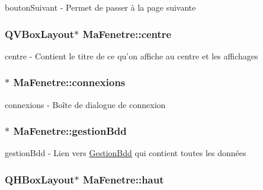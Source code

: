 bouton\-Suivant -\/ Permet de passer à la page suivante 

\hypertarget{class_ma_fenetre_aefa40adcb6099816353c31ea230ec1af}{
\subsubsection[{centre}]{\setlength{\rightskip}{0pt plus 5cm}Q\-V\-Box\-Layout$\ast$ Ma\-Fenetre\-::centre\hspace{0.3cm}{\ttfamily [protected]}}}\label{class_ma_fenetre_aefa40adcb6099816353c31ea230ec1af}


centre -\/ Contient le titre de ce qu'on affiche au centre et les affichages 

\hypertarget{class_ma_fenetre_a3c115601ad85a01422813dcdf48eb44d}{
\subsubsection[{connexions}]{$\ast$ Ma\-Fenetre\-::connexions\hspace{0.3cm}{\ttfamily [protected]}}}\label{class_ma_fenetre_a3c115601ad85a01422813dcdf48eb44d}


connexions -\/ Boîte de dialogue de connexion 

\hypertarget{class_ma_fenetre_a34d71a96cedb508c72afb02c70ff9609}{
\subsubsection[{gestion\-Bdd}]{$\ast$ Ma\-Fenetre\-::gestion\-Bdd\hspace{0.3cm}{\ttfamily [protected]}}}\label{class_ma_fenetre_a34d71a96cedb508c72afb02c70ff9609}


gestion\-Bdd -\/ Lien vers \hyperlink{class_gestion_bdd}{Gestion\-Bdd} qui contient toutes les données 

\hypertarget{class_ma_fenetre_acd485d3f85c155925df773f028f9e537}{
\subsubsection[{haut}]{\setlength{\rightskip}{0pt plus 5cm}Q\-H\-Box\-Layout$\ast$ Ma\-Fenetre\-::haut\hspace{0.3cm}{\ttfamily [protected]}}}\label{class_ma_fenetre_acd485d3f85c155925df773f028f9e537}


